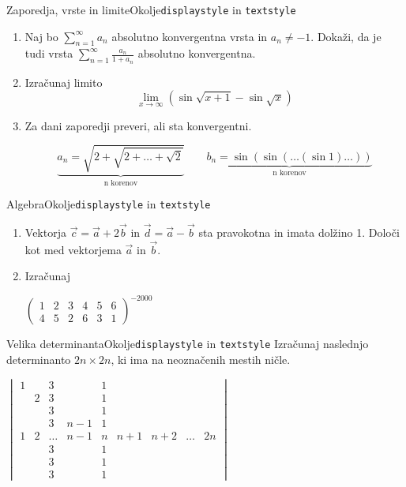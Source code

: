 \begin{frame}{Zaporedja, vrste in limite}{Okolje\texttt{displaystyle} in \texttt{textstyle}}
	\begin{enumerate}
		\item 
		Naj bo  $\sum_{n=1}^\infty{a_n}$ absolutno konvergentna vrsta in $a_n \ne -1$.
		Dokaži, da je tudi vrsta $\sum_{n=1}^\infty \frac{a_n}{1+a_n}$
		absolutno konvergentna.

		\item
		Izračunaj limito
		$$\lim_{x\to\infty} (\sin\sqrt{x+1}-\sin\sqrt{x})$$
		

		\item
		Za dani zaporedji preveri, ali sta konvergentni.
	
	\[
	\underbrace{a_n = \sqrt{2+\sqrt{2+\dots+\sqrt{2}}} }_{\text{n korenov}} \qquad
 \underbrace{b_n = \sin(\sin(\dots(\sin 1)\dots))}_{\text{n korenov}}\]
		
	\end{enumerate}
\end{frame}

\begin{frame}{Algebra}{Okolje\texttt{displaystyle} in \texttt{textstyle}}
	\begin{enumerate}
		\item
		Vektorja $\vec{c}=\vec{a}+2\vec{b}$ in $\vec{d}=\vec{a}-\vec{b}$
		sta pravokotna in imata dolžino 1. Določi kot med vektorjema $\vec{a}$ in $\vec{b}$.
		\item 
		Izračunaj

		$\begin{pmatrix}
			1 & 2 & 3 & 4 & 5 & 6\\
			4 & 5 & 2 & 6 & 3 & 1
		\end{pmatrix}^{-2000}$

		
	\end{enumerate}
\end{frame}

\begin{frame}{Velika determinanta}{Okolje\texttt{displaystyle} in \texttt{textstyle}}
	Izračunaj naslednjo determinanto $2n \times 2n$, ki ima na neoznačenih mestih ničle.
	
	$\begin{vmatrix}
		1 &   & 3 & & 1 & & & &\\
		  & 2 & 3 & & 1 & & & &\\
		  &   & 3 & & 1 & & & &\\
		  &   & 3 & n-1 & 1 & & & &\\
		1 & 2 & \dots & n-1 & n & n+1 & n+2 & \dots & 2n\\
		  &   & 3 & & 1 & & & &\\
		  &   & 3 & & 1 & & & &\\
		  &   & 3 & & 1 & & & &
		\end{vmatrix}$

\end{frame}

